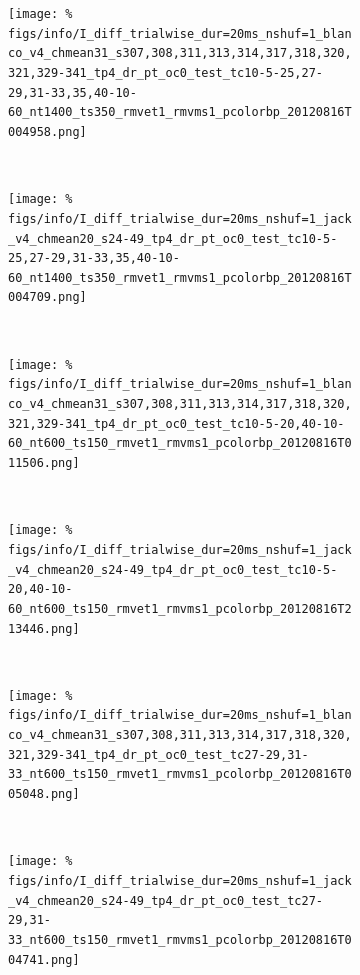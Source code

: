 \begin{figure}[htbp]
    \begin{subfigure}[b]{0.5\linewidth}
        \centering
        \caption{}
        \label{fig:b4-alldif}
        \texttt{[image: \%
figs/info/I\_diff\_trialwise\_dur=20ms\_nshuf=1\_blanco\_v4\_chmean31\_s307,308,311,313,314,317,318,320,321,329-341\_tp4\_dr\_pt\_oc0\_test\_tc10-5-25,27-29,31-33,35,40-10-60\_nt1400\_ts350\_rmvet1\_rmvms1\_pcolorbp\_20120816T004958.png]}
    \end{subfigure}
    ~~
    \begin{subfigure}[b]{0.5\linewidth}
        \centering
        \caption{}
        \label{fig:j4-alldif}
        \texttt{[image: \%
figs/info/I\_diff\_trialwise\_dur=20ms\_nshuf=1\_jack\_v4\_chmean20\_s24-49\_tp4\_dr\_pt\_oc0\_test\_tc10-5-25,27-29,31-33,35,40-10-60\_nt1400\_ts350\_rmvet1\_rmvms1\_pcolorbp\_20120816T004709.png]}
    \end{subfigure}
    \\
    \begin{subfigure}[b]{0.5\linewidth}
        \centering
        \caption{}
        \label{fig:b4-cdif}
        \texttt{[image: \%
figs/info/I\_diff\_trialwise\_dur=20ms\_nshuf=1\_blanco\_v4\_chmean31\_s307,308,311,313,314,317,318,320,321,329-341\_tp4\_dr\_pt\_oc0\_test\_tc10-5-20,40-10-60\_nt600\_ts150\_rmvet1\_rmvms1\_pcolorbp\_20120816T011506.png]}
    \end{subfigure}
    ~~
    \begin{subfigure}[b]{0.5\linewidth}
        \centering
        \caption{}
        \label{fig:j4-cdif}
        \texttt{[image: \%
figs/info/I\_diff\_trialwise\_dur=20ms\_nshuf=1\_jack\_v4\_chmean20\_s24-49\_tp4\_dr\_pt\_oc0\_test\_tc10-5-20,40-10-60\_nt600\_ts150\_rmvet1\_rmvms1\_pcolorbp\_20120816T213446.png]}
    \end{subfigure}
    \\
    \begin{subfigure}[b]{0.5\linewidth}
        \centering
        \caption{}
        \label{fig:b4-fdif}
        \texttt{[image: \%
figs/info/I\_diff\_trialwise\_dur=20ms\_nshuf=1\_blanco\_v4\_chmean31\_s307,308,311,313,314,317,318,320,321,329-341\_tp4\_dr\_pt\_oc0\_test\_tc27-29,31-33\_nt600\_ts150\_rmvet1\_rmvms1\_pcolorbp\_20120816T005048.png]}
    \end{subfigure}
    ~~
    \begin{subfigure}[b]{0.5\linewidth}
        \centering
        \caption{}
        \label{fig:j4-fdif}
        \texttt{[image: \%
figs/info/I\_diff\_trialwise\_dur=20ms\_nshuf=1\_jack\_v4\_chmean20\_s24-49\_tp4\_dr\_pt\_oc0\_test\_tc27-29,31-33\_nt600\_ts150\_rmvet1\_rmvms1\_pcolorbp\_20120816T004741.png]}

\end{subfigure}
\end{figure}

